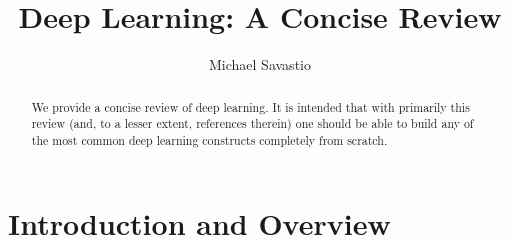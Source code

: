 \documentclass{article}
\title{Deep Learning: A Concise Review}
\author{Michael Savastio}
\date{}
\begin{document}
\maketitle
\begin{abstract}
    We provide a concise review of deep learning.  It is intended that with primarily this review (and, to a lesser extent, references therein) one should be
    able to build any of the most common deep learning constructs completely from scratch.
\end{abstract}

\section{Introduction and Overview}




\end{document}
